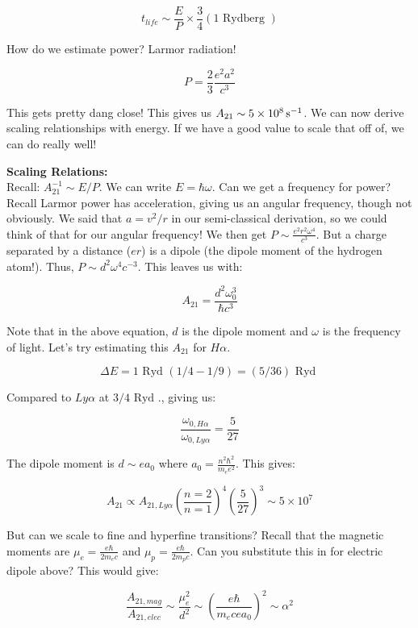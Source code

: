 \documentclass{article}
\newcommand{\unit}[1]{{\,\rm #1}}
\newcommand{\be}{\begin{equation}}
\newcommand{\ee}{\end{equation}}
\newcommand{\s}{\unit{s}}
\begin{document}
\begin{equation}
    t_{life} \sim \frac{E}{P} \times \frac{3}{4}(1 \text{ Rydberg })
\end{equation}

How do we estimate power? Larmor radiation!

\begin{equation}
    P = \frac23 \frac{e^2 a^2}{c^3}
\end{equation}

This gets pretty dang close! This gives us $A_{21} \sim 5 \times 10^{8} \s^{-1}$. We can now derive scaling relationships with energy. If we have a good value to scale that off of, we can do really well!

\textbf{Scaling Relations:}\\

Recall: $A_{21}^{-1} \sim E/P$. We can write $E = \hbar \omega$. Can we get a frequency for power? Recall Larmor power has acceleration, giving us an angular frequency, though not obviously. We said that $a = v^2 / r$ in our semi-classical derivation, so we could think of that for our angular frequency! We then get $P \sim \frac{e^2 r^2 \omega^4}{c^3}$. But a charge separated by a distance ($er$) is a dipole (the dipole moment of the hydrogen atom!). Thus, $P \sim d^2 \omega^4 c^{-3}$. This leaves us with:

\be
\boxed{A_{21} = \frac{d^2 \omega_0^3}{\hbar c^3}}
\ee

Note that in the above equation, $d$ is the dipole moment and $\omega$ is the frequency of light. Let's try estimating this $A_{21}$ for $H\alpha$. 

\be
\Delta E = 1 \text{ Ryd } (1/4 - 1/9) = (5/36) \text{ Ryd }
\ee

Compared to $Ly\alpha$ at $3/4 \text{ Ryd }$., giving us:

\be
\frac{\omega_{0,H\alpha}}{\omega_{0,Ly\alpha}} = \frac{5}{27}
\ee

The dipole moment is $d \sim e a_0$ where $a_0 = \frac{n^2 \hbar^2}{m_e e^2}$. This gives:

\be
    A_{21} \propto A_{21,Ly\alpha} \left(\frac{n=2}{n=1}\right)^4 \left(\frac{5}{27}\right)^3 \sim 5 \times 10^{7}
\ee

But can we scale to fine and hyperfine transitions? Recall that the magnetic moments are $\mu_e = \frac{e \hbar}{2 m_e c}$ and $\mu_p = \frac{e \hbar}{2 m_p c}$. Can you substitute this in for electric dipole above? This would give:

\be
\frac{A_{21,mag}}{A_{21,elec}} \sim \frac{\mu_e^2}{d^2} \sim \left(\frac{e \hbar}{m_e c e a_0}\right)^2 \sim \alpha^2
\ee
\end{document}
